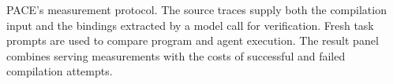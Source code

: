 \caption{PACE's measurement protocol.
The source traces supply both the compilation input and the bindings extracted by a model call for verification.
Fresh task prompts are used to compare program and agent execution.
The result panel combines serving measurements with the costs of successful and failed compilation attempts.}
